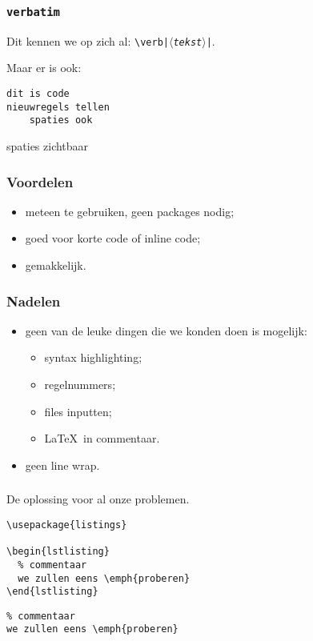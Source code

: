 \begin{frame}[fragile]
  \frametitle{\texttt{verbatim}}

  Dit kennen we op zich al: \texttt{\textbackslash verb|$\langle$\textsl{tekst}$\rangle$|}.

  Maar er is ook:
  \begin{LTXexample}
\begin{verbatim}
dit is code
nieuwregels tellen
    spaties ook
\end{verbatim}
  \end{LTXexample}

  \begin{LTXexample}
\begin{verbatim*}
    spaties zichtbaar
\end{verbatim*}
  \end{LTXexample}
\end{frame}

\begin{frame}
  \frametitle{Voordelen}

  \begin{itemize}
    \item meteen te gebruiken, geen packages nodig;
    \item goed voor korte code of inline code;
    \item gemakkelijk.
  \end{itemize}
\end{frame}

\begin{frame}
  \frametitle{Nadelen}

  \begin{itemize}
    \item geen van de leuke dingen die we konden doen is mogelijk:
      \begin{itemize}
        \item syntax highlighting;
        \item regelnummers;
        \item files inputten;
        \item \LaTeX\ in commentaar.
      \end{itemize}
    \item geen line wrap.
  \end{itemize}
\end{frame}

\begin{frame}[fragile]
  \frametitle{}

  De oplossing voor al onze problemen.
  \begin{verbatim}
\usepackage{listings}

\begin{lstlisting}
  % commentaar
  we zullen eens \emph{proberen}
\end{lstlisting}
\end{verbatim}

\begin{lstlisting}
% commentaar
we zullen eens \emph{proberen}
\end{lstlisting}
\end{frame}

